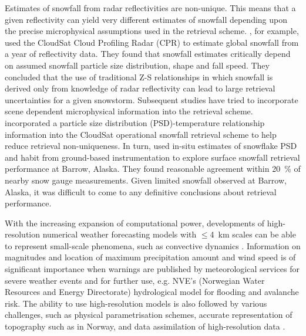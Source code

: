 Estimates of snowfall from radar reflectivities are non-unique.  This means that a given reflectivity can yield very different estimates of snowfall depending upon the precise microphysical assumptions used in the retrieval scheme. \citet{kulie_utilizing_2009}, for example, used the CloudSat Cloud Profiling Radar (CPR) to estimate global snowfall from a year of reflectivity data. They found that snowfall estimates critically depend on assumed snowfall particle size distribution, shape and fall speed.  They concluded that the use of traditional Z-S relationships in which snowfall is derived only from knowledge of radar reflectivity can lead to large retrieval uncertainties for a given snowstorm.  Subsequent studies have tried to incorporate scene dependent microphysical information into the retrieval scheme. \citet{wood_estimation_2011} incorporated a particle size distribution (PSD)-temperature relationship information into the CloudSat operational snowfall retrieval scheme to help reduce retrieval non-uniqueness.  In turn, \citet{cooper_variational_2017} used in-situ estimates of snowflake PSD and habit from ground-based instrumentation to explore surface snowfall retrieval performance at Barrow, Alaska. They found reasonable agreement within \SI{20}{\percent} of nearby snow gauge measurements. Given limited snowfall observed at Barrow, Alaska, it was difficult to come to any definitive conclusions about retrieval performance.
\par\medskip
\noindent
With the increasing expansion of computational power, developments of high-resolution numerical weather forecasting models with $\le$\SI{4}{\km} scales can be able to represent small-scale phenomena, such as convective dynamics \citep{gowan_validation_2018}. 
Information on magnitudes and location of maximum precipitation amount and wind speed is of significant importance when warnings are published by meteorological services for severe weather events and for further use, e.g. NVE's (Norwegian Water Resources and Energy Directorate) hydrological model for flooding and avalanche risk.
The ability to use high-resolution models is also followed by various challenges, such as physical parametrisation schemes, accurate representation of topography such as in Norway, and data assimilation of high-resolution data \citep{sun_convective-scale_2005}. 
